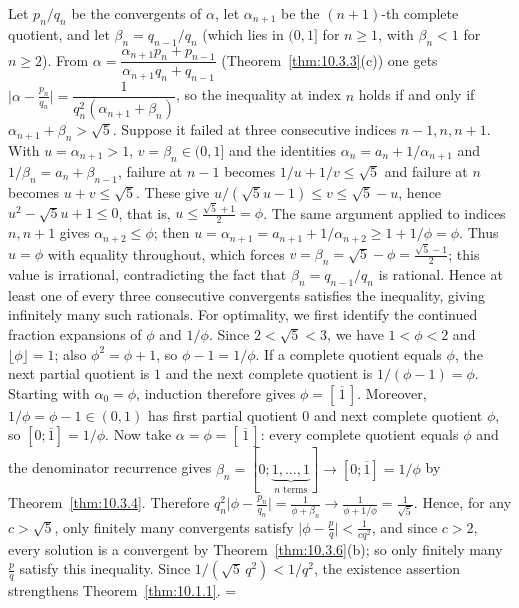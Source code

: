 \documentclass[11pt]{article}
\makeatletter
\theoremstyle{ntstyle}
\let\nt@closedisplay\]
\def\nt@guardedclose{\@ifnextchar\par{\nt@closeafterpar}{\@ifnextchar\end{\postdisplaypenalty\@M\nt@closedisplay}{\nt@closedisplay}}}
\def\nt@closeafterpar\par{\@ifnextchar\par{\nt@closeafterpar}{\@ifnextchar\end{\postdisplaypenalty\@M\nt@closedisplay\par}{\nt@closedisplay\par}}}
\renewenvironment{proof}[1][\proofname]{\par
  \pushQED{\qed}\normalfont\topsep\medskipamount\edef\nt@afterproof{\@endparpenalty=\the\@endparpenalty\relax}\@beginparpenalty\@M\@endparpenalty\@M\let\]\nt@guardedclose\trivlist\item[]\textit{#1\@addpunct{.}} \ignorespaces}{\ifvmode\addpenalty\@M\fi\popQED\nt@afterproof\endtrivlist\@endpefalse}
\makeatother
\begin{document}
\begin{proof} Let $p_n/q_n$ be the convergents of
	$\alpha$, let $\alpha_{n+1}$ be the $(n+1)$-th complete quotient, and let
	$\beta_n=q_{n-1}/q_n$ (which lies in $(0,1]$ for $n\ge1$, with
	$\beta_n<1$ for $n\ge2$). From
	$\alpha=\dfrac{\alpha_{n+1}p_n+p_{n-1}}{\alpha_{n+1}q_n+q_{n-1}}$
	(Theorem~\ref{thm:10.3.3}(c)) one gets
	$\big|\alpha-\tfrac{p_n}{q_n}\big|=\dfrac{1}{q_n^2(\alpha_{n+1}+\beta_n)}$,
	so the inequality at index $n$ holds if and only if
	$\alpha_{n+1}+\beta_n>\sqrt{5}$. Suppose it failed at three consecutive
	indices $n-1,n,n+1$. With $u=\alpha_{n+1}>1$, $v=\beta_n\in(0,1]$
	and the identities $\alpha_n=a_n+1/\alpha_{n+1}$ and $1/\beta_n=a_n+\beta_{n-1}$,
	failure at $n-1$ becomes $1/u+1/v\le\sqrt{5}$ and failure at $n$
	becomes $u+v\le\sqrt{5}$. These give $u/(\sqrt{5}u-1)\le v\le\sqrt{5}-u$,
	hence $u^2-\sqrt{5}u+1\le0$, that is, $u\le\tfrac{\sqrt{5}+1}{2}=\phi$. The
	same argument applied to indices $n,n+1$ gives $\alpha_{n+2}\le\phi$;
	then $u=\alpha_{n+1}=a_{n+1}+1/\alpha_{n+2}\ge1+1/\phi=\phi$. Thus
	$u=\phi$ with equality throughout, which forces
	$v=\beta_n=\sqrt{5}-\phi=\tfrac{\sqrt{5}-1}{2}$; this value is irrational,
	contradicting the fact that $\beta_n=q_{n-1}/q_n$ is rational. Hence at least
	one of every three consecutive convergents satisfies the inequality,
	giving infinitely many such rationals. For optimality, we first identify the continued fraction
	expansions of $\phi$ and $1/\phi$. Since
	$2<\sqrt5<3$, we have $1<\phi<2$ and $\lfloor\phi\rfloor=1$; also
	$\phi^2=\phi+1$, so $\phi-1=1/\phi$. If a complete quotient equals
	$\phi$, the next partial quotient is $1$ and the next complete quotient
	is $1/(\phi-1)=\phi$. Starting with $\alpha_0=\phi$, induction therefore
	gives $\phi=[\,\overline1\,]$. Moreover, $1/\phi=\phi-1\in(0,1)$ has
	first partial quotient $0$ and next complete quotient $\phi$, so
	$[0;\overline1]=1/\phi$. Now take
	$\alpha=\phi=[\,\overline1\,]$: every complete quotient equals $\phi$
	and the denominator recurrence gives
	$\beta_n=[0;\underbrace{1,\ldots,1}_{n\text{ terms}}]\to[0;\overline1]=1/\phi$
	by Theorem~\ref{thm:10.3.4}. Therefore
	$q_n^2\big|\phi-\tfrac{p_n}{q_n}\big|=\tfrac{1}{\phi+\beta_n}\to\tfrac{1}{\phi+1/\phi}=\tfrac{1}{\sqrt{5}}$.
	Hence, for any $c>\sqrt{5}$, only finitely many convergents satisfy
	$\big|\phi-\tfrac{p}{q}\big|<\tfrac{1}{cq^2}$, and since $c>2$, every
	solution is a convergent by Theorem~\ref{thm:10.3.6}(b); so only finitely many
	$\tfrac{p}{q}$ satisfy this inequality.
	Since $1/(\sqrt{5}\,q^2)<1/q^2$, the existence assertion strengthens
	Theorem~\ref{thm:10.1.1}.
\end{proof}
\end{document}

